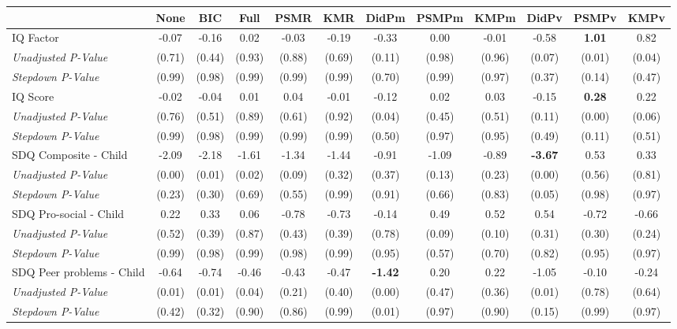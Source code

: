 \begin{tabular}{l c c c c c c c c c c c}
\toprule
 & None & BIC & Full & PSMR & KMR & DidPm & PSMPm & KMPm & DidPv & PSMPv & KMPv \\
\midrule
IQ Factor & -0.07 & -0.16 & 0.02 & -0.03 & -0.19 & -0.33 & 0.00 & -0.01 & -0.58 & \textbf{ 1.01 } & 0.82 \\
\quad \textit{Unadjusted P-Value} & (0.71) & (0.44) & (0.93) & (0.88) & (0.69) & (0.11) & (0.98) & (0.96) & (0.07) & (0.01) & (0.04) \\
\quad \textit{Stepdown P-Value} & (0.99) & (0.98) & (0.99) & (0.99) & (0.99) & (0.70) & (0.99) & (0.97) & (0.37) & (0.14) & (0.47) \\
IQ Score & -0.02 & -0.04 & 0.01 & 0.04 & -0.01 & -0.12 & 0.02 & 0.03 & -0.15 & \textbf{ 0.28 } & 0.22 \\
\quad \textit{Unadjusted P-Value} & (0.76) & (0.51) & (0.89) & (0.61) & (0.92) & (0.04) & (0.45) & (0.51) & (0.11) & (0.00) & (0.06) \\
\quad \textit{Stepdown P-Value} & (0.99) & (0.98) & (0.99) & (0.99) & (0.99) & (0.50) & (0.97) & (0.95) & (0.49) & (0.11) & (0.51) \\
SDQ Composite - Child & -2.09 & -2.18 & -1.61 & -1.34 & -1.44 & -0.91 & -1.09 & -0.89 & \textbf{ -3.67 } & 0.53 & 0.33 \\
\quad \textit{Unadjusted P-Value} & (0.00) & (0.01) & (0.02) & (0.09) & (0.32) & (0.37) & (0.13) & (0.23) & (0.00) & (0.56) & (0.81) \\
\quad \textit{Stepdown P-Value} & (0.23) & (0.30) & (0.69) & (0.55) & (0.99) & (0.91) & (0.66) & (0.83) & (0.05) & (0.98) & (0.97) \\
SDQ Pro-social - Child & 0.22 & 0.33 & 0.06 & -0.78 & -0.73 & -0.14 & 0.49 & 0.52 & 0.54 & -0.72 & -0.66 \\
\quad \textit{Unadjusted P-Value} & (0.52) & (0.39) & (0.87) & (0.43) & (0.39) & (0.78) & (0.09) & (0.10) & (0.31) & (0.30) & (0.24) \\
\quad \textit{Stepdown P-Value} & (0.99) & (0.98) & (0.99) & (0.98) & (0.99) & (0.95) & (0.57) & (0.70) & (0.82) & (0.95) & (0.97) \\
SDQ Peer problems - Child & -0.64 & -0.74 & -0.46 & -0.43 & -0.47 & \textbf{ -1.42 } & 0.20 & 0.22 & -1.05 & -0.10 & -0.24 \\
\quad \textit{Unadjusted P-Value} & (0.01) & (0.01) & (0.04) & (0.21) & (0.40) & (0.00) & (0.47) & (0.36) & (0.01) & (0.78) & (0.64) \\
\quad \textit{Stepdown P-Value} & (0.42) & (0.32) & (0.90) & (0.86) & (0.99) & (0.01) & (0.97) & (0.90) & (0.15) & (0.99) & (0.97) \\

\end{tabular}
